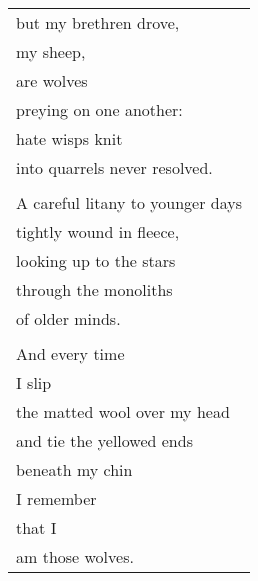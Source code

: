 \documentclass{article}
\begin{document}
\begin{center}
\begin{tabular}{l}
but my brethren drove, \\
my sheep, \\
are wolves \\
preying on one another: \\
hate wisps knit \\
into quarrels never resolved. \\
\\
A careful litany to younger days \\
tightly wound in fleece, \\
looking up to the stars \\
through the monoliths \\
of older minds. \\
\\
And every time \\
I slip \\
the matted wool over my head \\
and tie the yellowed ends \\
beneath my chin \\
I remember \\
that I \\
am those wolves. \\
\end{tabular}
\end{center}
\end{document}
